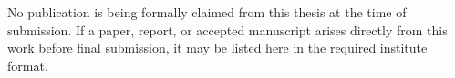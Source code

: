 
\noindent No publication is being formally claimed from this thesis at the time of submission. If a paper,
report, or accepted manuscript arises directly from this work before final submission, it may be listed here
in the required institute format.

\clearpage
